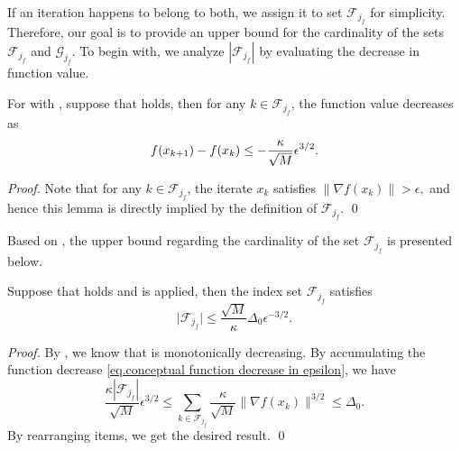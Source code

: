 If an iteration happens to belong to both, we assign it to set $\mathcal{F}_{j_f}$ for simplicity. Therefore, our goal is to provide an upper bound for the cardinality of the sets $\mathcal{F}_{j_f}$ and $\mathcal{G}_{j_f}$. To begin with, we analyze $|\mathcal{F}_{j_f}|$ by evaluating the decrease in function value.

\begin{lemma}
    \label{lem.conceptual decrease in epsilon}
    For  with , suppose that  holds, then for any $k \in \mathcal{F}_{j_f}$, the function value decreases as
    \begin{equation}
        \label{eq.conceptual function decrease in epsilon}
        f(x_{k+1})-f(x_k) \leq -\frac{\kappa}{\sqrt{M}}\epsilon^{3/2}.
    \end{equation}
\end{lemma}
\begin{proof}
    Note that for any $k \in \mathcal{F}_{j_f}$, the iterate $x_k$ satisfies
    $
        \|\nabla f(x_k)\| > \epsilon,
    $
    and hence this lemma is directly implied by the definition of $\mathcal{F}_{j_f}$.
\smartqed \qed \end{proof}

Based on , the upper bound regarding the cardinality of the set $\mathcal{F}_{j_f}$ is presented below.
\begin{corollary}
    \label{coro.conceptual upperbound set n}
    Suppose that  holds and  is applied, then the index set $\mathcal{F}_{j_f}$ satisfies
    \begin{equation}
        \label{eq.conceptual upper bound set n}
        \vert \mathcal{F}_{j_f} \vert \leq \frac{\sqrt{M}}{\kappa}\Delta_0\epsilon^{-3/2}.
    \end{equation}
\end{corollary}
\begin{proof}
    By , we know that  is monotonically decreasing. By accumulating the function decrease \eqref{eq.conceptual function decrease in epsilon}, we have
    \begin{equation*}
        \frac{\kappa|\mathcal{F}_{j_f}|}{\sqrt{M}}\epsilon^{3/2} 
        \leq \sum_{k \in \mathcal{F}_{j_f}} \frac{\kappa}{\sqrt M} \|\nabla f(x_k)\|^{3/2}
        \leq \Delta_0.
    \end{equation*}
    By rearranging items, we get the desired result.
\smartqed \qed \end{proof}


